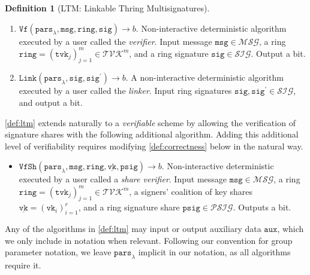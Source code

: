 \documentclass[11pt]{article}
\theoremstyle{definition}
\newtheorem{definition}[definition]{Definition}
\newcommand{\vk}{\texttt{vk}}
\newcommand{\tvk}{\texttt{tvk}}
\newcommand{\ring}{\texttt{ring}}
\newcommand{\VK}{\underline{\texttt{vk}}}
\newcommand{\sig}{\texttt{sig}}
\newcommand{\psig}{\texttt{psig}}
\newcommand{\secpar}{\lambda}
\newcommand{\params}{\texttt{pars}}
\newcommand{\msg}{\texttt{msg}}
\newcommand{\setupO}{\params_\secpar}
\newcommand{\verify}{\texttt{Vf}}
\newcommand{\verifyI}{(\setupO,\msg,\ring,\sig)}
\newcommand{\verifyO}{b}
\newcommand{\verifyIObase}{\verify\verifyI\to\verifyO}
\newcommand{\link}{\texttt{Link}}
\newcommand{\linkI}{(\setupO,\sig,\sig^\prime)}
\newcommand{\linkO}{\verifyO}
\newcommand{\linkIObase}{\link\linkI\to\linkO}
\newcommand{\verifyshare}{\texttt{VfSh}}
\newcommand{\verifyshareI}{(\setupO,\msg,\ring,\VK,\psig)}
\newcommand{\verifyshareO}{\verifyO}
\newcommand{\verifyshareIObase}{\verifyshare\verifyshareI\to\verifyshareO}
\begin{document}
\begin{definition}[LTM: Linkable Thring Multisignatures]
\begin{enumerate}
\item $\verifyIObase$. Non-interactive deterministic algorithm executed by a user called the \textit{verifier}. Input message $\msg \in \mathcal{MSG}$, a ring  $\ring = (\tvk_j)_{j=1}^{m} \in \mathcal{TVK}^m$, and a ring signature $\sig \in \mathcal{SIG}$. Output a bit.

\item $\linkIObase$. A non-interactive deterministic algorithm executed by a user called the \textit{linker}.  Input ring signatures $\sig, \sig^\prime \in \mathcal{SIG}$, and output a bit.
\end{enumerate}

\end{definition}

\cref{def:ltm} extends naturally to a \textit{verifiable} scheme by allowing the verification of signature shares with the following additional algorithm.
Adding this additional level of verifiability requires modifying \cref{def:correctness} below in the natural way.


\begin{itemize}
\item $\verifyshareIObase$. Non-interactive deterministic executed by a user called a \textit{share verifier}. Input message $\msg \in \mathcal{MSG}$, a ring $\ring = (\tvk_j)_{j=1}^{m} \in \mathcal{TVK}^m$, a signers' coalition of key shares $\VK=(\vk_i)_{i=1}^{r}$, and a ring signature share $\psig \in \mathcal{PSIG}$. Outputs a bit.
\end{itemize}

Any of the algorithms in \cref{def:ltm} may input or output auxiliary data $\texttt{aux}$, which we only include in notation when relevant. Following our convention for group parameter notation, we leave $\params_\secpar$ implicit in our notation, as all algorithms require it.
\end{document}
